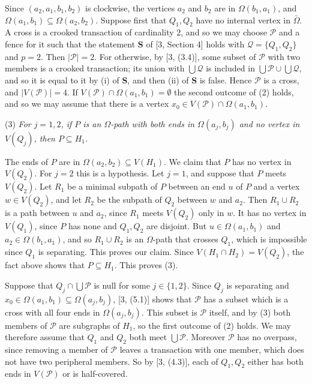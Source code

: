 {Since $(a_2, a_1, b_1, b_2)$ is clockwise, the vertices $a_2$ and $b_2$ are in $\Omega(b_1, a_1)$, and $\Omega(a_1, b_1) \subseteq \Omega(a_2, b_2)$. Suppose first that $Q_1, Q_2$ have no internal vertex in $\bar{\Omega}$. A cross is a crooked transaction of cardinality $2$, and so we may choose $\mathscr{P}$ and a fence for it such that the statement \textbf{S} of [3, Section 4] holds with $\mathscr{Q} = \{Q_1, Q_2\}$ and $p = 2$. Then $|\mathscr{P}| = 2$. For otherwise, by [3, (3.4)], some subset of $\mathscr{P}$ with two members is a crooked transaction; its union with $\bigcup \mathscr{Q}$ is included in $\bigcup \mathscr{P} \cup \bigcup \mathscr{Q}$, and so it is equal to it by (i) of \textbf{S}, and then (ii) of \textbf{S} is false. Hence $\mathscr{P}$ is a cross, and $|V(\mathscr{P})| = 4$. If $V(\mathscr{P}) \cap \Omega(a_1, b_1) = \emptyset$ the second outcome of (2) holds, and so we may assume that there is a vertex $x_0 \in V(\mathscr{P}) \cap \Omega(a_1, b_1)$.

\hspace*{12pt}(3) \textit{For $j = 1, 2$, if $P$ is an $\Omega$-path with both ends in $\Omega(a_j, b_j)$ and no vertex in $V(Q_j)$, then $P \subseteq H_1$.}

The ends of $P$ are in $\Omega(a_2, b_2) \subseteq V(H_1)$. We claim that $P$ has no vertex in $V(Q_2)$. For $j = 2$ this is a hypothesis. Let $j = 1$, and suppose that $P$ meets $V(Q_2)$. Let $R_1$ be a minimal subpath of $P$ between an end $u$ of $P$ and a vertex $w \in V(Q_2)$, and let $R_2$ be the subpath of $Q_2$ between $w$ and $a_2$. Then $R_1 \cup R_2$ is a path between $u$ and $a_2$, since $R_1$ meets $V(Q_2)$ only in $w$. It has no vertex in $V(Q_1)$, since $P$ has none and $Q_1, Q_2$ are disjoint. But $u \in \Omega(a_1, b_1)$ and $a_2 \in \Omega(b_1, a_1)$, and so $R_1 \cup R_2$ is an $\Omega$-path that crosses $Q_1$, which is impossible since $Q_1$ is separating. This proves our claim. Since $V(H_1 \cap H_2) = V(Q_2)$, the fact above shows that $P \subseteq H_1$. This proves (3).

Suppose that $Q_j \cap \bigcup \mathscr{P}$ is null for some $j \in \{1, 2\}$. Since $Q_j$ is separating and $x_0 \in \Omega(a_1, b_1) \subseteq \Omega(a_j, b_j)$, [3, (5.1)] shows that $\mathscr{P}$ has a subset which is a cross with all four ends in $\Omega(a_j, b_j)$. This subset is $\mathscr{P}$ itself, and by (3) both members of $\mathscr{P}$ are subgraphs of $H_1$, so the first outcome of (2) holds. We may therefore assume that $Q_1$ and $Q_2$ both meet $\bigcup \mathscr{P}$. Moreover $\mathscr{P}$ has no overpass, since removing a member of $\mathscr{P}$ leaves a transaction with one member, which does not have two peripheral members. So by [3, (4.3)], each of $Q_1, Q_2$ either has both ends in $V(\mathscr{P})$ or is half-covered.

}
